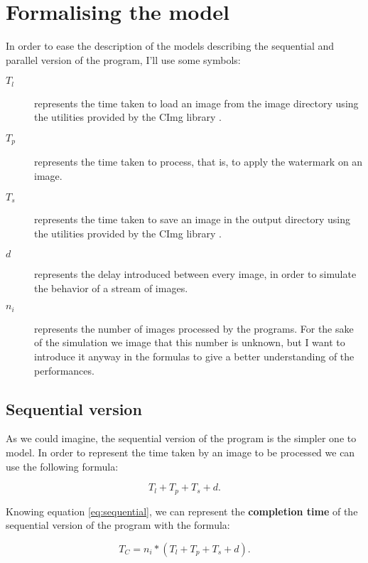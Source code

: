     \section{Formalising the model} %
    \label{sec:formalising_the_model}
        In order to ease the description of the models describing the sequential and parallel version of the
        program, I'll use some symbols:
        \begin{description}
            \item[$T_l$] represents the time taken to load an image from the image directory using the utilities
            provided by the CImg library \cite{cimg}.
            \item[$T_p$] represents the time taken to process, that is, to apply the watermark on an image.
            \item[$T_s$] represents the time taken to save an image in the output directory using the utilities
            provided by the CImg library \cite{cimg}.
            \item[$d$] represents the delay introduced between every image, in order to simulate the behavior of
            a stream of images.
            \item[$n_i$] represents the number of images processed by the programs. For the sake of the
            simulation we image that this number is unknown, but I want to introduce it anyway in the formulas
            to give a better understanding of the performances.
        \end{description}
        \subsection{Sequential version} %
        \label{sub:sequential_version}
            As we could imagine, the sequential version of the program is the simpler one to model. In order to
            represent the time taken by an image to be processed we can use the following formula:

            \begin{equation}
                T_l + T_p + T_s + d.
                \label{eq:sequential}
            \end{equation}

            Knowing equation \ref{eq:sequential}, we can represent the \textbf{completion time} of the sequential
            version of the program with the formula:

            \begin{equation}
                T_C = n_i * \left ( T_l + T_p + T_s + d \right ).
                \label{eq:completion_time_sequential}
            \end{equation}


